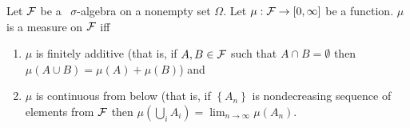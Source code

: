 \begin{theorem}
    Let ${\cal F}$ be a \ $\sigma$-algebra on a nonempty set $\Omega$. Let $\mu : {\cal F} \to  [0, \infty]$ be a function. $\mu$ is a measure on ${\cal F}$ iff 
	\begin{enumerate}
	    \item$\mu$ is finitely additive (that is, if $A,B \in {\cal F}$ such that $A\cap B =\emptyset$ then $\mu (A \cup B) = \mu (A) + \mu (B)$) and 
	    \item $\mu$ is continuous from below (that is, if $\left\{ A_n \right\}$ is nondecreasing sequence of elements from ${\cal F}$ then $\mu\left( \bigcup_i A_i \right) = \lim_{n\to\infty} \mu \left( A_n \right)$.
	    \end{enumerate}
    \label{thm:equiv-measure}
\end{theorem}
